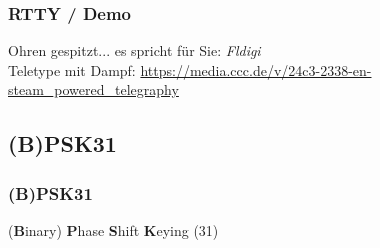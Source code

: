\begin{frame}
    \frametitle{RTTY / Demo}

    \Large{Ohren gespitzt... es spricht für Sie: \emph{Fldigi}}\\[2em]
    \pause
    Teletype mit Dampf: \url{https://media.ccc.de/v/24c3-2338-en-steam_powered_telegraphy}

\end{frame}

 
\subsection{(B)PSK31}

\begin{frame}
    \frametitle{(B)PSK31}
 
    (\textbf{B}inary) \textbf{P}hase \textbf{S}hift \textbf{K}eying (31)


\end{frame}
